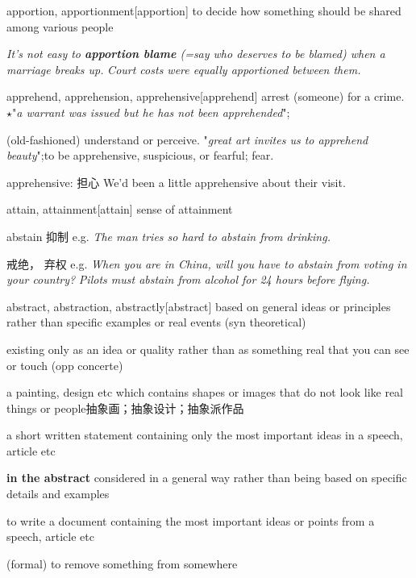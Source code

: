 \begin{word}{apportion, apportionment}[apportion]
    to decide how something should be shared among various people

    \textit{It’s not easy to \textbf{apportion blame} (=say who deserves to be blamed) when a marriage breaks up.}
    \textit{Court costs were equally apportioned between them.}
\end{word}

\begin{word}{apprehend, apprehension, apprehensive}[apprehend]
    arrest (someone) for a crime.
    $\star$"\textit{a warrant was issued but he has not been apprehended}";
    
    (old-fashioned) understand or perceive.
    "\textit{great art invites us to apprehend beauty}";to be apprehensive, suspicious, or fearful; fear.

    apprehensive: 担心 We'd been a little {apprehensive} about their visit.
\end{word}

\begin{word}{attain, attainment}[attain]
    sense of attainment
\end{word}

\begin{word}{abstain}
    抑制
    e.g. \textit{The man tries so hard to abstain from drinking.}
    
    戒绝， 弃权
    e.g. \textit{When you are in China, will you have to abstain from voting in your country?}
    \textit{Pilots must abstain from alcohol for 24 hours before flying.}
\end{word}

\begin{word}{abstract, abstraction, abstractly}[abstract]
    based on general ideas or principles rather than specific examples or real events (syn theoretical)

    existing only as an idea or quality rather than as something real that you can see or touch (opp concerte)

    a painting, design etc which contains shapes or images that do not look like real things or people抽象画；抽象设计；抽象派作品

    a short written statement containing only the most important ideas in a speech, article etc
    
    \textbf{in the abstract} considered in a general way rather than being based on specific details and examples

    to write a document containing the most important ideas or points from a speech, article etc

    (formal) to remove something from somewhere
\end{word}


